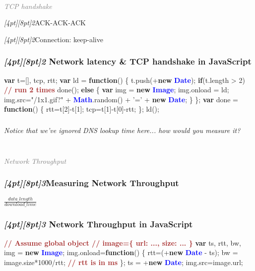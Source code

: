 \documentclass{beamer}
\newcommand{\sn}[1]{\textrm{\textit{\Huge{\raisebox{-3pt}[4pt][8pt]{\textcolor{f2elblue}{#1}}}}}\hspace{4pt}}
\newcommand{\innersplash}[1]{
  \begin{center}
    \large \textrm{\textit{ #1 } }
  \end{center}
}
\newcommand{\splashslide}[2][{}]{
  \begin{frame}
  \frametitle{#1}
  \innersplash{#2}
  \end{frame}
}
\newcommand{\leadinslide}[2]{
  \splashslide{
     {\fontsize{150}{20}\selectfont{\raisebox{0pt}[90pt][0pt]{\textcolor{light-gray}{#1}}}} \\ \huge \textcolor{gray}{#2}
  }
}
\def\brown<#1>#2{\textcolor<#1>{brown}{\textbf<#1>{#2}}}
\def\green<#1>#2{\textcolor<#1>{dark-green}{\textbf<#1>{#2}}}
\def\blue<#1>#2{\textcolor<#1>{blue}{\textbf<#1>{#2}}}
\begin{document}
\leadinslide{2}{TCP handshake}

\begin{frame}{\sn{2}ACK-ACK-ACK}
\end{frame}

\begin{frame}{\sn{2}Connection: keep-alive}
\end{frame}

\begin{frame}[fragile]
\frametitle{\sn{2} Network latency \& TCP handshake in JavaScript}
\vspace{-.3cm}
\begin{semiverbatim}
\green<1>{var} t=[], tcp, rtt;
\green<1>{var} ld = \green<1>{function}() \{
   t.push(+\green<1>{new} \blue<1>{Date});
   \green<1>{if}(t.length > 2)  \brown<1>{// run 2 times}
     done();
   \green<1>{else} \{
     \green<1>{var} img = \green<1>{new} \blue<1>{Image};
     img.onload = ld;
     img.src="/1x1.gif?" + \blue<1>{Math}.random()
                         + '=' + \green<1>{new} \blue<1>{Date};
   \}
\};
\green<1>{var} done = \green<1>{function}() \{
  rtt=t[2]-t[1];
  tcp=t[1]-t[0]-rtt;
\};
ld();
\end{semiverbatim}
\end{frame}

\splashslide{Notice that we've ignored DNS lookup time here... how would you measure it?}

\leadinslide{3}{Network Throughput}

\splashslide[\sn{3}Measuring Network Throughput]{\LARGE{\( \frac{data\_length}{download\_time} \)}}

\begin{frame}[fragile]
\frametitle{\sn{3} Network Throughput in JavaScript}
\begin{semiverbatim}
\brown<1>{// Assume global object
// image=\{ url: ..., size: ... \}}
\green<1>{var} ts, rtt, bw, img = \green<1>{new} \blue<1>{Image};
img.onload=\green<1>{function}() \{
   rtt=(+\green<1>{new} \blue<1>{Date} - ts);
   bw = image.size*1000/rtt;    \brown<1>{// rtt is in ms}
\};
ts = +\green<1>{new} \blue<1>{Date};
img.src=image.url;
\end{semiverbatim}
\end{frame}
\end{document}
